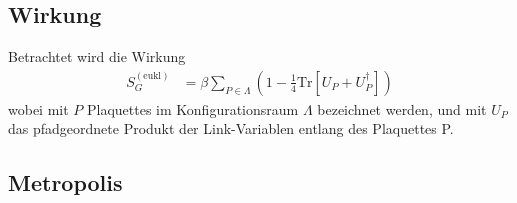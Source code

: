 

\subsection{Wirkung}

Betrachtet wird die Wirkung
\begin{align*}
  S_G^{(\textrm{eukl})} &= \beta \sum_{P \in \Lambda} \left(1-\frac{1}{4} \textrm{Tr} \left[ U_P + U_P^\dagger \right] \right)
\end{align*}
wobei mit $P$ Plaquettes im Konfigurationsraum $\Lambda$ bezeichnet werden, und mit $U_P$ das pfadgeordnete Produkt der Link-Variablen entlang des Plaquettes P.

\subsection{Metropolis}





